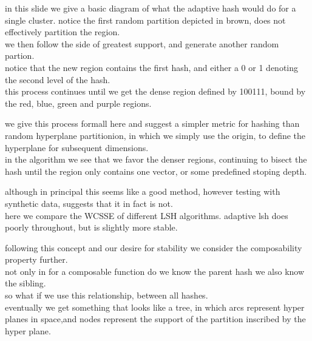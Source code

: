 \documentclass{beamer}
\begin{document}
\begin{frame}[plain]
in this slide we give a basic diagram of what the adaptive hash would do for a single
cluster. notice the first random partition depicted in brown, does not effectively
partition the region. \\
we then follow the side of greatest support, and generate
another random partion. \\
notice that the new region contains the first hash, and
either a 0 or 1 denoting the second level of the hash. \\
this process continues until
we get the dense region defined by 100111, bound by the red, blue, green and purple
regions.
\end{frame}

\begin{frame}[plain]
we give this process formall here and suggest a simpler metric for hashing than
random hyperplane partitionion, in which we simply use the origin, to define the
hyperplane for subsequent dimensions. \\
in the algorithm we see that we favor
the denser regions, continuing to bisect the hash until the region only contains
one vector, or some predefined stoping depth.
\end{frame}

\begin{frame}[plain]
although in principal this seems like a good method, however testing with
synthetic data, suggests that it in fact is not. \\
here we compare the WCSSE
of different LSH algorithms. adaptive lsh does poorly throughout, but is
slightly more stable.
\end{frame}

\begin{frame}[plain]
following this concept and our desire for stability we consider the composability
property further. \\
not only in for a composable function do we know the parent hash
we also know the sibling. \\
so what if we use this relationship, between all hashes.\\
eventually we get something that looks like a tree, in which arcs represent hyper
planes in space,and nodes represent the support of the partition inscribed by the
hyper plane.
\end{frame}
\end{document}

